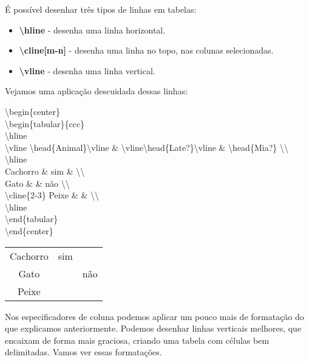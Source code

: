 É possível desenhar três tipos de linhas em tabelas:

\begin{itemize}
\item\textbf{\textbackslash hline} - desenha uma linha horizontal.
\item\textbf{\textbackslash cline[m-n]} - desenha uma linha no topo, nas colunas selecionadas.
\item\textbf{\textbackslash vline} - desenha uma linha vertical.
\end{itemize}

Vejamos uma aplicação descuidada dessas linhas:

\noindent\textbackslash begin\{center\}\\
\textbackslash begin\{tabular\}\{ccc\}\\
	\textbackslash hline \\
	\textbackslash vline \textbackslash head\{Animal\}\textbackslash vline \& \textbackslash vline\textbackslash head\{Late?\}\textbackslash vline \& \textbackslash head\{Mia?\} \textbackslash \textbackslash \\
	\textbackslash hline\\
	Cachorro \& sim \&     \textbackslash \textbackslash \\
	Gato     \&     \& não \textbackslash \textbackslash \\
	\textbackslash cline\{2-3\} Peixe    \&     \&     \textbackslash \textbackslash \\
	\textbackslash hline\\
\textbackslash end\{tabular\}\\
\textbackslash end\{center\}\\

\begin{center}
\begin{tabular}{ccc}
	\hline %
	\vline \head{Animal}\vline & \vline\head{Late?}\vline & \head{Mia?} \\
	\hline
	Cachorro & sim &     \\
	Gato     &     & não \\
	\cline{2-3} Peixe    &     &     \\
	\hline
\end{tabular}
\end{center}

Nos especificadores de coluna podemos aplicar um pouco mais de formatação do
que explicamos anteriormente. Podemos desenhar linhas verticais melhores, que
encaixam de forma mais graciosa, criando uma tabela com células bem
delimitadas. Vamos ver essas formatações.

